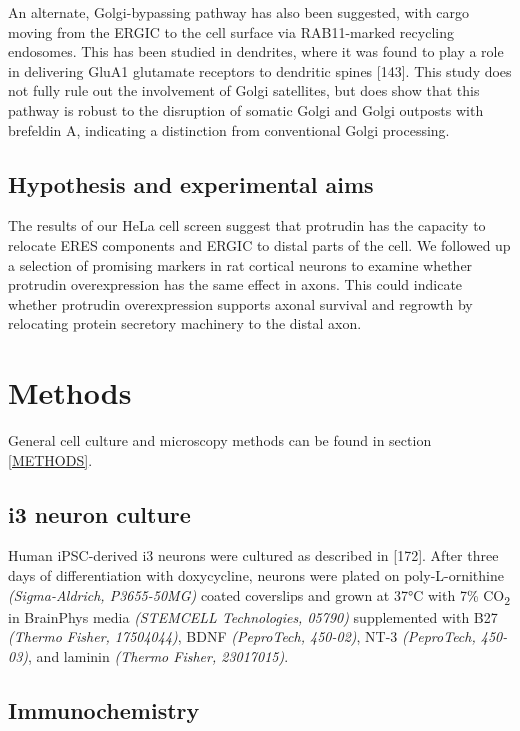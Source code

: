 \documentclass[
  12pt,
  a4paper,
]{book}
\begin{document}
An alternate, Golgi-bypassing pathway has also been suggested, with cargo moving from the ERGIC to the cell surface via RAB11-marked recycling endosomes. This has been studied in dendrites, where it was found to play a role in delivering GluA1 glutamate receptors to dendritic spines {[}143{]}. This study does not fully rule out the involvement of Golgi satellites, but does show that this pathway is robust to the disruption of somatic Golgi and Golgi outposts with brefeldin A, indicating a distinction from conventional Golgi processing.

\subsection{Hypothesis and experimental aims}\label{hypothesis-and-experimental-aims-2}

The results of our HeLa cell screen suggest that protrudin has the capacity to relocate ERES components and ERGIC to distal parts of the cell. We followed up a selection of promising markers in rat cortical neurons to examine whether protrudin overexpression has the same effect in axons. This could indicate whether protrudin overexpression supports axonal survival and regrowth by relocating protein secretory machinery to the distal axon.

\section{Methods}\label{methods-2}

General cell culture and microscopy methods can be found in section \ref{METHODS}.

\subsection{i3 neuron culture}\label{i3-neuron-culture}

Human iPSC-derived i3 neurons were cultured as described in {[}172{]}. After three days of differentiation with doxycycline, neurons were plated on poly-L-ornithine \emph{(Sigma-Aldrich, P3655-50MG)} coated coverslips and grown at 37°C with 7\% CO\textsubscript{2} in BrainPhys media \emph{(STEMCELL Technologies, 05790)} supplemented with B27 \emph{(Thermo Fisher, 17504044)}, BDNF \emph{(PeproTech, 450-02)}, NT-3 \emph{(PeproTech, 450-03)}, and laminin \emph{(Thermo Fisher, 23017015)}.

\subsection{Immunochemistry}\label{immunochemistry}
\end{document}
